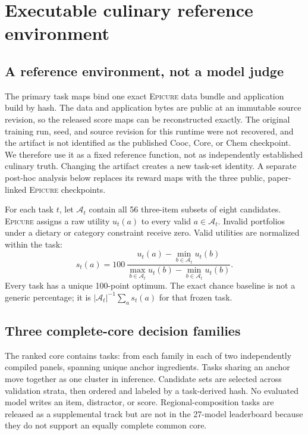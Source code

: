 \documentclass[10pt,twocolumn]{article}
\newcommand{\epicure}{\textsc{Epicure}}
\begin{document}
\section{Executable culinary reference environment}
\label{sec:ground-truth}

\subsection{A reference environment, not a model judge}

The primary task maps bind one exact \epicure{} data bundle and application build by hash. The data
and application bytes are public at an immutable source revision, so the released score maps can
be reconstructed exactly. The original training run, seed, and source revision for this runtime
were not recovered, and the artifact is not identified as the published Cooc, Core, or Chem
checkpoint. We therefore use it as a fixed reference function, not as independently established
culinary truth. Changing the artifact creates a new task-set identity. A separate post-hoc analysis
below replaces its reward maps with the three public, paper-linked \epicure{} checkpoints.

For each task $t$, let $\mathcal{A}_t$ contain all 56 three-item subsets of eight candidates.
\epicure{} assigns a raw utility $u_t(a)$ to every valid $a\in\mathcal{A}_t$. Invalid portfolios
under a dietary or category constraint receive zero. Valid utilities are normalized within the
task:
\begin{equation}
 s_t(a)=100\,\frac{u_t(a)-\min_{b\in\mathcal{A}_t}u_t(b)}
 {\max_{b\in\mathcal{A}_t}u_t(b)-\min_{b\in\mathcal{A}_t}u_t(b)}.
 \label{eq:task-score}
\end{equation}
Every task has a unique 100-point optimum. The exact chance baseline is not a generic percentage;
it is $|\mathcal{A}_t|^{-1}\sum_a s_t(a)$ for that frozen task.

\subsection{Three complete-core decision families}

The ranked core contains \FBTasks{} tasks: \FBTasksPerPanelFamily{} from each family in each of two
independently compiled panels, spanning \FBUniqueAnchors{} unique anchor ingredients. Tasks sharing
an anchor move together as one cluster in inference. Candidate sets are selected across validation
strata, then ordered and labeled by a task-derived hash. No evaluated model writes an item,
distractor, or score. Regional-composition tasks are released as a supplemental track but are not
in the 27-model leaderboard because they do not support an equally complete common core.
\end{document}
